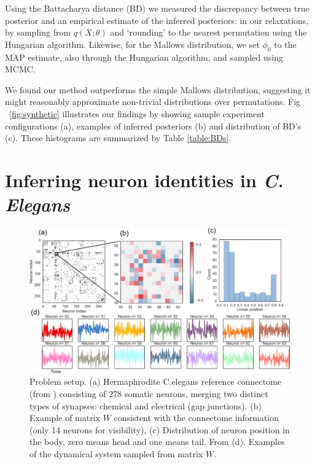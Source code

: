 \documentclass[twoside]{article}
\begin{document}
 Using the Battacharya distance (BD) we measured the discrepancy
 between true posterior and an empirical estimate of the inferred
 posteriors: in our relaxations, by sampling from $q(X; \theta)$ and `rounding'
 to the nearest permutation using the Hungarian algorithm. Likewise, for the Mallows distribution, we set $\phi_0$ to the MAP estimate, also through the Hungarian algorithm, and sampled using MCMC.
 
 We found our method outperforms the simple Mallows distribution, suggesting it might reasonably approximate non-trivial distributions over permutations. Fig ~\ref{fig:synthetic} illustrates our findings by showing sample experiment configurations (a), examples of inferred posteriors (b) and distribution of BD's (c). These histograms are summarized by Table \ref{table:BDs}.


\section{Inferring neuron identities in \textit{C. Elegans}}
\label{sec:celegans}

\begin{figure}[ht]
  \centering
  \includegraphics[width=1.0\textwidth]{../figures/figure6.pdf} 
  \caption{Problem setup. (a) Hermaphrodite C.elegans reference
    connectome (from \cite{varshney2011structural,wormatlas})
    consisting of 278 somatic neurons, merging two distinct types of
    synapses: chemical and electrical (gap junctions). (b) Example of
    matrix $W$ consistent with the connectome information (only 14
    neurons for visibility), (c) Distribution of neuron position in
    the body, zero means head and one means tail. From
    \cite{white1986structure,wormatlas} (d). Examples of the dynamical
    system sampled from matrix $W$.}
  \label{fig:connectome}
\end{figure}
\end{document}
